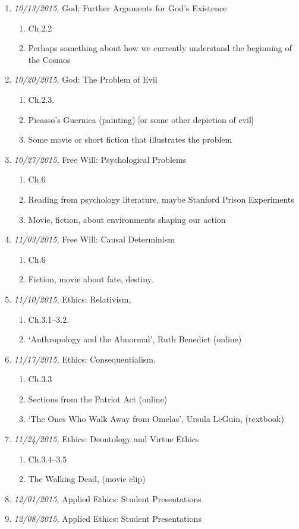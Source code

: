 \documentclass[11pt,article,oneside]{memoir}
\begin{document}
\begin{enumerate}
\item \textit{10/13/2015,} God: Further Arguments for God's Existence
\begin{enumerate}
\item Ch.2.2
\item Perhaps something about how we currently understand the beginning of the Cosmos
\end{enumerate}
\item \textit{10/20/2015,} God: The Problem of Evil 
\begin{enumerate}
\item Ch.2.3.
\item Picasso's Guernica (painting) [or some other depiction of evil]
\item Some movie or short fiction that illustrates the problem
\end{enumerate}
\item \textit{10/27/2015,} Free Will: Psychological Problems
\begin{enumerate}
\item Ch.6
\item Reading from psychology literature, maybe Stanford Prison Experiments
\item Movie, fiction, about environments shaping our action
\end{enumerate}
\item \textit{11/03/2015,} Free Will: Causal Determinism
\begin{enumerate}
\item Ch.6
\item Fiction, movie about fate, destiny.
\end{enumerate}
\item \textit{11/10/2015,} Ethics: Relativism, 
\begin{enumerate}
\item Ch.3.1--3.2.
\item `Anthropology and the Abnormal', Ruth Benedict (online)
\end{enumerate}
\item \textit{11/17/2015,} Ethics: Consequentialism. 
\begin{enumerate}
\item Ch.3.3
\item Sections from the Patriot Act (online)
\item  `The Ones Who Walk Away from Omelas', Ursula LeGuin, (textbook)
\end{enumerate}
\item \textit{11/24/2015,} Ethics: Deontology and Virtue Ethics
\begin{enumerate}
\item Ch.3.4--3.5
\item The Walking Dead, (movie clip)
\end{enumerate}
\item \textit{12/01/2015,} Applied Ethics: Student Presentations
\item \textit{12/08/2015,} Applied Ethics: Student Presentations
\end{enumerate}
\end{document}
